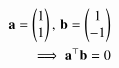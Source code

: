 \begin{align}
	\mathbf{a}=\begin{pmatrix}1\\1\end{pmatrix},\,
\mathbf{b}=\begin{pmatrix}1\\-1\end{pmatrix}\\
\implies \mathbf{a} ^\top \mathbf{b} =  0 
\end{align}


